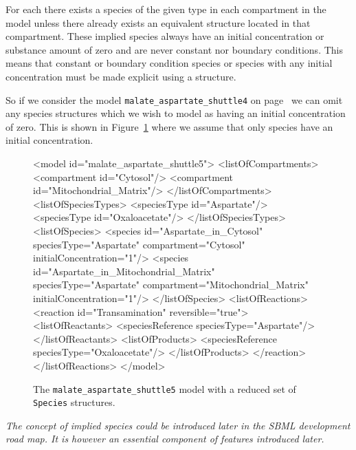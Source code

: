 \documentclass{cekarticle}
\begin{document}
For each  there exists a species of the given
type in each compartment in the model unless there already exists
an equivalent  structure located in that
compartment.  These implied species always have an initial
concentration or substance amount of zero and are never constant
nor boundary conditions. This means that constant or boundary
condition species or species with any initial concentration must
be made explicit using a  structure.

So if we consider the model \texttt{malate\_aspartate\_shuttle4}
on page~\pageref{fig:malate_aspartate_shuttle4-xml} we can omit
any species structures which we wish to model as having an initial
concentration of zero.   This is shown in
Figure~\ref{fig:malate_aspartate_shuttle5-xml} where we assume
that only  species have an initial concentration.

\begin{figure}[h]
\begin{example}
<model id="malate_aspartate_shuttle5">
    <listOfCompartments>
        <compartment id="Cytosol"/>
        <compartment id="Mitochondrial_Matrix"/>
    </listOfCompartments>
    <listOfSpeciesTypes>
        <speciesType id="Aspartate"/>
        <speciesType id="Oxaloacetate"/>
    </listOfSpeciesTypes>
    <listOfSpecies>
        <species
            id="Aspartate_in_Cytosol"
            speciesType="Aspartate"
            compartment="Cytosol"
            initialConcentration="1"/>
        <species
            id="Aspartate_in_Mitochondrial_Matrix"
            speciesType="Aspartate"
            compartment="Mitochondrial_Matrix"
            initialConcentration="1"/>
    </listOfSpecies>
    <listOfReactions>
        <reaction id="Transamination" reversible="true">
            <listOfReactants>
                <speciesReference speciesType="Aspartate"/>
            </listOfReactants>
            <listOfProducts>
                <speciesReference speciesType="Oxaloacetate"/>
            </listOfProducts>
        </reaction>
    </listOfReactions>
</model>
\end{example}
\caption{The \texttt{malate\_aspartate\_shuttle5} model with a
reduced set of \texttt{Species} structures.}
\label{fig:malate_aspartate_shuttle5-xml}
\end{figure}


\emph{The concept of implied species could be introduced later in the SBML development road map.
It is however an essential component of features introduced later.}
\end{document}
